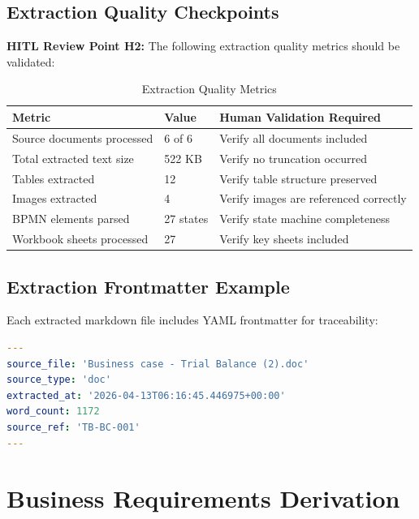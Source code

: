 \documentclass[11pt,a4paper]{article}
\begin{document}
\subsection{Extraction Quality Checkpoints}

\textbf{HITL Review Point H2:} The following extraction quality metrics should be validated:

\begin{table}[h]
\centering
\caption{Extraction Quality Metrics}
\begin{tabular}{@{}L{5cm}C{2.5cm}L{6.5cm}@{}}
\toprule
\textbf{Metric} & \textbf{Value} & \textbf{Human Validation Required} \\
\midrule
Source documents processed & 6 of 6 & Verify all documents included \\
Total extracted text size & 522 KB & Verify no truncation occurred \\
Tables extracted & 12 & Verify table structure preserved \\
Images extracted & 4 & Verify images are referenced correctly \\
BPMN elements parsed & 27 states & Verify state machine completeness \\
Workbook sheets processed & 27 & Verify key sheets included \\
\bottomrule
\end{tabular}
\end{table}

\subsection{Extraction Frontmatter Example}

Each extracted markdown file includes YAML frontmatter for traceability:

\begin{lstlisting}[language=yaml, caption=Extraction Frontmatter Example]
---
source_file: 'Business case - Trial Balance (2).doc'
source_type: 'doc'
extracted_at: '2026-04-13T06:16:45.446975+00:00'
word_count: 1172
source_ref: 'TB-BC-001'
---
\end{lstlisting}


\newpage
\section{Business Requirements Derivation}
\end{document}
